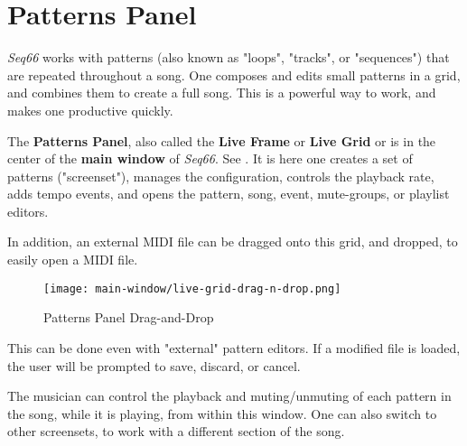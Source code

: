 %
%
%

\section{Patterns Panel}
\label{sec:patterns_panel}

   \textsl{Seq66} works with patterns (also known as "loops", "tracks", or
   "sequences") that are repeated throughout a song.
   One composes and edits small patterns in a grid,
   and combines them to create a full song.
   This is a powerful way to work, and makes one productive quickly.

   The \textbf{Patterns Panel}, also called the
   \textbf{Live Frame} or
   \textbf{Live Grid} or
   is in the center of the
   \textbf{main window} of \textsl{Seq66}.
   See .
   It is here one creates a set of patterns ("screenset"),
   manages the configuration, controls the playback rate, adds tempo events,
   and opens the pattern, song, event, mute-groups, or playlist editors.

   In addition, an external MIDI file can be dragged onto this grid,
   and dropped, to easily open a MIDI file.

\begin{figure}[H]
   \centering 
   \texttt{[image: main-window/live-grid-drag-n-drop.png]}
   \caption{Patterns Panel Drag-and-Drop}
   \label{fig:patterns_panel_drag_n_drop}
\end{figure}

   This can be done even with "external" pattern editors.
   If a modified file is loaded, the user
   will be prompted to save, discard, or cancel.

   The musician can
   control the playback and muting/unmuting of each pattern in
   the song, while it is playing, from within this window.
   One can also switch to other screensets, to work with a different
   section of the song.

